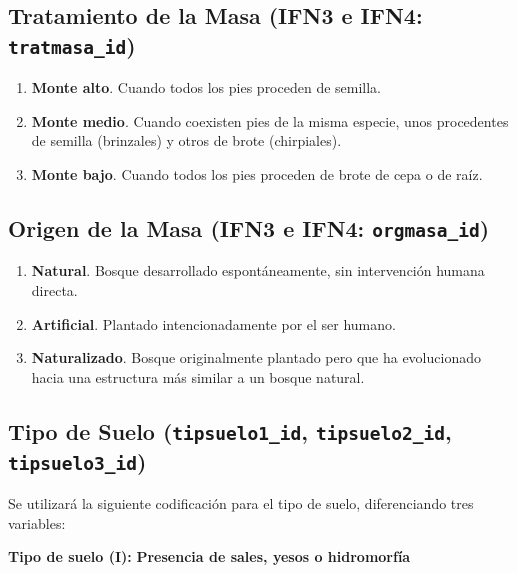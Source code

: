 \subsection{Tratamiento de la Masa (IFN3 e IFN4: \texttt{tratmasa\_id})}\label{sec:tratmasa}

\begin{enumerate}
    \item \textbf{Monte alto}. Cuando todos los pies proceden de semilla.
    \item \textbf{Monte medio}. Cuando coexisten pies de la misma especie, unos procedentes de semilla (brinzales) y otros de brote (chirpiales).
    \item \textbf{Monte bajo}. Cuando todos los pies proceden de brote de cepa o de raíz.
\end{enumerate}


\subsection{Origen de la Masa (IFN3 e IFN4: \texttt{orgmasa\_id})}\label{sec:OrgMasa}

\begin{enumerate}
    \item \textbf{Natural}. Bosque desarrollado espontáneamente, sin intervención humana directa.
    \item \textbf{Artificial}. Plantado intencionadamente por el ser humano.
    \item \textbf{Naturalizado}. Bosque originalmente plantado pero que ha evolucionado hacia una estructura más similar a un bosque natural.
\end{enumerate}


\subsection{Tipo de Suelo (\texttt{tipsuelo1\_id}, \texttt{tipsuelo2\_id}, \texttt{tipsuelo3\_id})}\label{sec:TipSuelo}

Se utilizará la siguiente codificación para el tipo de suelo, diferenciando tres variables:

\vspace{1em}
\noindent
\textbf{Tipo de suelo (I):} \textbf{Presencia de sales, yesos o hidromorfía}

